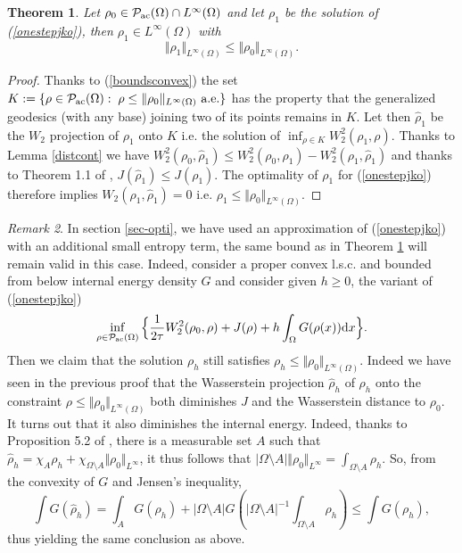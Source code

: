 \documentclass[12pt, a4paper]{article}
\numberwithin{equation}{section}
\theoremstyle{plain}
\newtheorem{thm}{Theorem}[section]
\theoremstyle{definition}
\theoremstyle{remark}
\newtheorem{rem}[thm]{Remark}
\newcommand\PPa{{\cal P}_{\rm{ac}}(\Omega)}
\newcommand\pref[1]{(\ref{#1})}
\begin{document}
 
 
 \begin{thm}\label{unifbound}
 Let $\rho_0 \in \PPa \cap L^\infty(\Omega)$ and let $\rho_1$ be the solution of \pref{onestepjko}, then $\rho_1 \in L^{\infty} (\Omega)$  with
 \begin{equation}\label{contraclp}
 \Vert \rho_1 \Vert_{L^\infty(\Omega)} \le \Vert \rho_0 \Vert_{L^\infty(\Omega)}. 
 \end{equation}
 
 \end{thm}
 
 \begin{proof}
 Thanks to \pref{boundsconvex} the set $K:=\{\rho \in \PPa  : \;  \rho \le \Vert \rho_0\Vert_{L^\infty(\Omega)} \mbox{ a.e.} \}$ has the property that the generalized geodesics (with any base) joining two of its points remains in $K$. Let then $\hat{\rho}_1$ be the $W_2$ projection of $\rho_1$ onto $K$ i.e. the solution of $\inf_{\rho\in K} W^2_2(\rho_1, \rho)$. Thanks to Lemma \ref{distcont} we have $W^2_2(\rho_0, \hat{\rho}_1)\le W_2^2(\rho_0, \rho_1)-W_2^2(\rho_1, \hat{\rho}_1)$ and thanks to Theorem 1.1 of \cite{de2016bv}, $J(\hat{\rho}_1) \le J(\rho_1)$. The optimality of $\rho_1$ for \pref{onestepjko} therefore implies $W_2(\rho_1, \hat{\rho}_1)=0$ i.e. $\rho_1 \le  \Vert \rho_0\Vert_{L^\infty(\Omega)}$.
 
 
 
  \end{proof}
 
 
 \begin{rem}\label{pmaxavecent}
 In section \ref{sec-opti}, we have used an approximation of \pref{onestepjko} with an additional small entropy term, the same bound as in Theorem  \ref{unifbound} will remain valid in this case. Indeed, consider a proper convex l.s.c.  and bounded from below internal energy density $G$ and consider given $h\ge 0$, the variant of \pref{onestepjko}
 \begin{equation}\label{onestepjkowithpenalty}
 \inf_{\rho \in \PPa}  \Big\{ \frac{1}{2\tau} W_2^2(\rho_0, \rho)+ J(\rho)+h \int_{\Omega} G(\rho(x)) \mbox{d} x \Big\}.
  \end{equation}
 Then we claim that the solution $\rho_h$ still satisfies $\rho_h \le \Vert \rho_0\Vert_{L^\infty(\Omega)}$. Indeed we have seen in the previous proof that the  Wasserstein projection $\hat{\rho}_h$ of $\rho_h$ onto the constraint $\rho \le \Vert \rho_0\Vert_{L^\infty(\Omega)}$ both diminishes $J$ and the Wasserstein distance to $\rho_0$. It turns out that it also diminishes the internal energy. Indeed, thanks to Proposition 5.2 of \cite{de2016bv}, there is  a measurable set $A$ such that $\hat{\rho}_h =\chi_A \rho_h + \chi_{\Omega \setminus A} \Vert \rho_0\Vert_{L^{\infty}}$, it thus follows that
$|\Omega\setminus A| \Vert \rho_0 \Vert_{L^\infty} = \int_{\Omega\setminus A}\rho_h$. So, 
 from the convexity of $G$ and Jensen's inequality,
 $$
 \int G(\hat \rho_h) = \int_{A} G(\rho_h) + |\Omega\setminus A| G\left(  |\Omega\setminus A|^{-1}   \int_{\Omega\setminus A} \rho_h \right)  \le \int G(\rho_h),
 $$ thus yielding the same conclusion as above. 
 
 \end{rem}
 
\end{document}
